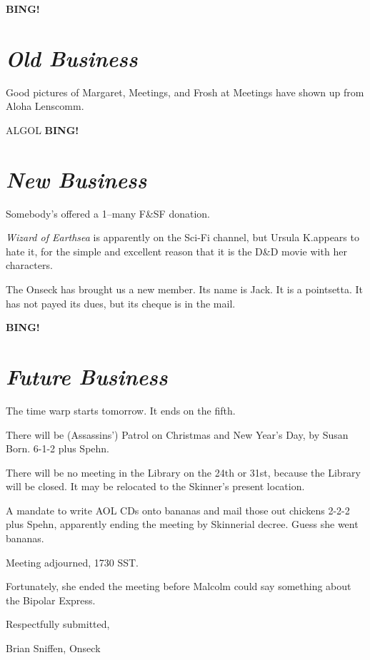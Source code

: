 \documentclass[10pt]{article}
\newcommand{\bing}{{\bf BING!} }
\newcommand{\goto}[1]{\bing \vskip 12pt \section*{{\em{#1}}}}
\newcommand{\ps}{ plus Spehn\xspace}
\begin{document}
\goto{Old Business}

Good pictures of Margaret, Meetings, and Frosh at Meetings have shown
up from Aloha Lenscomm.

ALGOL
\goto{New Business}
Somebody's offered a 1--many F\&SF donation.

\emph{Wizard of Earthsea} is apparently on the Sci-Fi channel, but
Ursula K.\LeGuin appears to hate it, for the simple and excellent
reason that it is the D\&D movie with her characters.

The Onseck has brought us a new member.  Its name is Jack.  It is a
pointsetta.  It has not payed its dues, but its cheque is in the mail.

\goto{Future Business}

The time warp starts tomorrow.  It ends on the fifth.

There will be (Assassins') Patrol on Christmas and New Year's Day, by
Susan Born.  6-1-2\ps.

There will be no meeting in the Library on the 24th or 31st, because
the Library will be closed.  It may be relocated to the Skinner's
present location.

A mandate to write AOL CDs onto bananas and mail those out chickens
2-2-2\ps, apparently ending the meeting by Skinnerial decree.  Guess
she went bananas.

\vspace{12pt}

\noindent
Meeting adjourned, 1730 SST.

Fortunately, she ended the meeting before Malcolm could say something
about the Bipolar Express.

\vspace{18pt}

\centerline{Respectfully submitted,}
\centerline{Brian Sniffen, Onseck}
\end{document}
